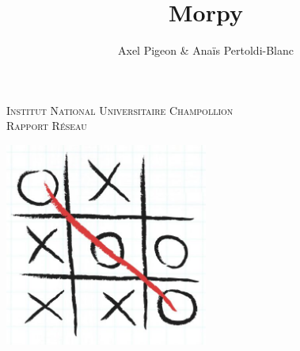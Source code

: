 \documentclass{report}
\begin{document}



\title{Morpy}
\author{Axel Pigeon \& Anaïs Pertoldi-Blanc}

\pagestyle{fancy}
\chead{}
\lfoot{}
\cfoot{\thepage}
\rfoot{}
\renewcommand\headrulewidth{1pt}
\renewcommand\footrulewidth{0pt}


\makeatletter
  \begin{titlepage}
  \centering
      {\large \textsc{Institut National Universitaire Champollion}}\\
      \textsc{Rapport Réseau}\\
    \vspace{1cm}
    \begin{center}
        \includegraphics[width=0.50\textwidth]{couverture.jpg}
    \end{center}
    \vspace{1cm}
       {\Huge \textbf{\@title}} \\
    \vspace{2em}
        {\large \@author} \\
  \end{titlepage}
\makeatother



\newpage



\raggedright
\justifying

\end{document}
